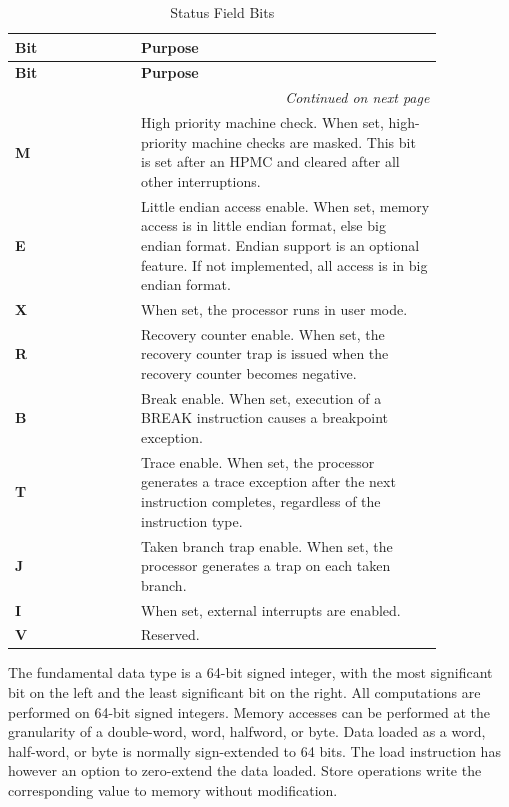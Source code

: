 
\begin{longtable}{@{}p{0.25\linewidth}p{0.6\linewidth}@{}}
    \caption{Status Field Bits} \\
    \toprule
    \textbf{Bit} & \textbf{Purpose} \\
    \midrule
    \endfirsthead
    \toprule
    \textbf{Bit} & \textbf{Purpose} \\
    \midrule
    \endhead
    \midrule
    \multicolumn{2}{r}{\textit{Continued on next page}} \\
    \midrule
    \endfoot
    \bottomrule
    \endlastfoot
    \textbf{M} & High priority machine check. When set, high-priority machine checks are masked. This bit is set after an HPMC and cleared after all other interruptions. \\
    \midrule
    \textbf{E} & Little endian access enable. When set, memory access is in little endian format, else big endian format. Endian support is an optional feature. If not implemented, all access is in big endian format. \\
    \midrule
    \textbf{X} & When set, the processor runs in user mode. \\
    \midrule
    \textbf{R} & Recovery counter enable. When set, the recovery counter trap is issued when the recovery counter becomes negative. \\
    \midrule
    \textbf{B} & Break enable. When set, execution of a BREAK instruction causes a breakpoint exception. \\
    \midrule
    \textbf{T} & Trace enable. When set, the processor generates a trace exception after the next instruction completes, regardless of the instruction type. \\
    \midrule
    \textbf{J} & Taken branch trap enable. When set, the processor generates a trap on each taken branch.  \\
    \midrule
    \textbf{I} & When set, external interrupts are enabled. \\
    \midrule 
    \textbf{V} & Reserved. \\
    \midrule 
\end{longtable}


The fundamental data type is a 64-bit signed integer, with the most significant bit on the left and the least significant bit on the right. All computations are performed on 64-bit signed integers. Memory accesses can be performed at the granularity of a double-word, word, halfword, or byte. Data loaded as a word, half-word, or byte is normally sign-extended to 64 bits. The load instruction has however an option to zero-extend the data loaded. Store operations write the corresponding value to memory without modification.

